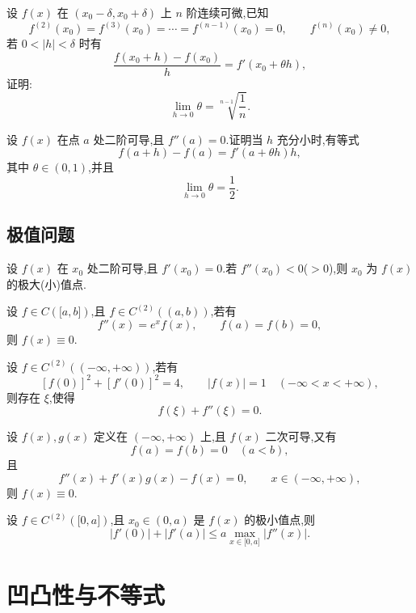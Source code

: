 \documentclass[../../数学分析培优讲义.tex]{subfiles}
\begin{document}
\begin{example}
设 $f(x)$ 在 $(x_0-\delta,x_0+\delta)$ 上 $n$ 阶连续可微,已知
\[
    f^{(2)}(x_0)=f^{(3)}(x_0)=\cdots=f^{(n-1)}(x_0)=0,
    \qquad f^{(n)}(x_0)\neq0,
\]
若 $0<|h|<\delta$ 时有
\[
    \dfrac{f(x_0+h)-f(x_0)}{h}=f'(x_0+\theta h),
\]
证明:
\[
    \lim\limits_{h\to0}\theta
    =\sqrt[n-1]{\dfrac{1}{n}}.
\]
\end{example}
\exampleblank

\begin{example}
设 $f(x)$ 在点 $a$ 处二阶可导,且 $f''(a)=0$.证明当 $h$ 充分小时,有等式
\[
    f(a+h)-f(a)=f'(a+\theta h)h,
\]
其中 $\theta\in(0,1)$,并且
\[
    \lim\limits_{h\to0}\theta=\dfrac{1}{2}.
\]
\end{example}
\exampleblank



\subsection{极值问题}

设 $f(x)$ 在 $x_0$ 处二阶可导,且 $f'(x_0)=0$.若 $f''(x_0)<0$($>0$),则 $x_0$ 为 $f(x)$ 的极大(小)值点.

\begin{example}
设 $f\in C(\lbrack a,b\rbrack)$,且 $f\in C^{(2)}((a,b))$,若有
\[
    f''(x)=e^x f(x),\qquad f(a)=f(b)=0,
\]
则 $f(x)\equiv0$.
\end{example}
\exampleblank

\begin{example}
设 $f\in C^{(2)}((-\infty,+\infty))$,若有
\[
    [f(0)]^2+[f'(0)]^2=4,
    \qquad |f(x)|=1\quad(-\infty<x<+\infty),
\]
则存在 $\xi$,使得
\[
    f(\xi)+f''(\xi)=0.
\]
\end{example}
\exampleblank

\begin{example}
设 $f(x),g(x)$ 定义在 $(-\infty,+\infty)$ 上,且 $f(x)$ 二次可导,又有
\[
    f(a)=f(b)=0\quad(a<b),
\]
且
\[
    f''(x)+f'(x)g(x)-f(x)=0,
    \qquad x\in(-\infty,+\infty),
\]
则 $f(x)\equiv0$.
\end{example}
\exampleblank

\begin{example}
设 $f\in C^{(2)}(\lbrack 0,a\rbrack)$,且 $x_0\in(0,a)$ 是 $f(x)$ 的极小值点,则
\[
    |f'(0)|+|f'(a)|
    \leq a\max\limits_{x\in\lbrack 0,a\rbrack}|f''(x)|.
\]
\end{example}
\exampleblank


\newpage

\section{凹凸性与不等式}
\end{document}
